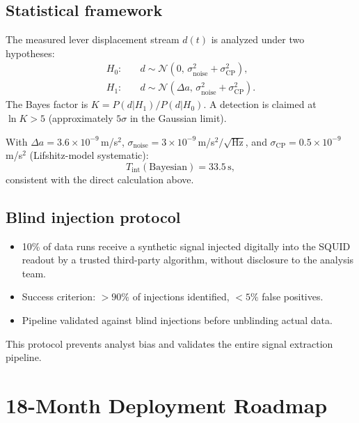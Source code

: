 \documentclass[11pt,letterpaper]{article}
\begin{document}
\subsection{Statistical framework}

The measured lever displacement stream $d(t)$ is analyzed under two hypotheses:
\begin{align}
  H_0:&\quad d \sim \mathcal{N}(0,\, \sigma_{\mathrm{noise}}^2 + \sigma_{\mathrm{CP}}^2), \\
  H_1:&\quad d \sim \mathcal{N}(\Delta a,\, \sigma_{\mathrm{noise}}^2 + \sigma_{\mathrm{CP}}^2).
\end{align}
The Bayes factor is $K = P(d|H_1)/P(d|H_0)$.  A detection is claimed at
$\ln K > 5$ (approximately $5\sigma$ in the Gaussian limit).

With $\Delta a = 3.6\times10^{-9}$\,m/s$^2$, $\sigma_{\mathrm{noise}}
= 3\times10^{-9}$\,m/s$^2/\sqrt{\mathrm{Hz}}$, and
$\sigma_{\mathrm{CP}} = 0.5\times10^{-9}$\,m/s$^2$ (Lifshitz-model systematic):
\begin{equation}
  T_{\mathrm{int}}(\text{Bayesian}) = 33.5\,\text{s},
\end{equation}
consistent with the direct calculation above.

\subsection{Blind injection protocol}

\begin{itemize}[noitemsep]
  \item 10\% of data runs receive a synthetic signal injected digitally into the SQUID
    readout by a trusted third-party algorithm, without disclosure to the analysis team.
  \item Success criterion: $>90\%$ of injections identified, $<5\%$ false positives.
  \item Pipeline validated against blind injections before unblinding actual data.
\end{itemize}

This protocol prevents analyst bias and validates the entire signal extraction pipeline.

\section{18-Month Deployment Roadmap}
\end{document}
